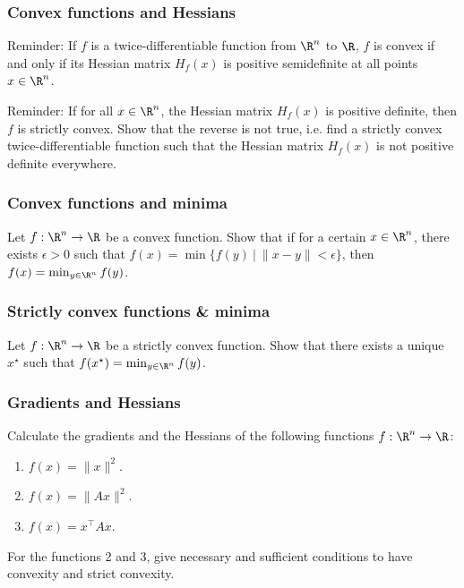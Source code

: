 \documentclass{beamer}
\begin{document}
\begin{frame}[t]
\frametitle{Convex functions and Hessians}
\vspace{-5pt}
Reminder: If $f$ is a twice-differentiable function from $\R^n$ to $\R$, $f$ is convex if and only if its Hessian matrix $H_f(x)$ is positive semidefinite at all points $x \in \R^n$.

Reminder: If for all $x \in \R^n$, the Hessian matrix $H_f(x)$ is positive definite, then $f$ is strictly convex. Show that the reverse is not true, i.e. find a strictly convex twice-differentiable function such that the Hessian matrix $H_f(x)$ is not positive definite everywhere.
\pause
\pause
\end{frame}

\begin{frame}[t]
\frametitle{Convex functions and minima}
Let $f : \R^n \rightarrow \R$ be a convex function. Show that if for a certain $x \in \R^n$, there exists $\epsilon > 0$ such that $f(x) = \min \{f(y) \ | \ \|x-y\| < \epsilon \}$, then $f(x) = \min_{y \in \R^n} f(y)$.
\pause
\end{frame}

\begin{frame}[t]
\frametitle{Strictly convex functions \& minima}
Let $f : \R^n \rightarrow \R$ be a strictly convex function. Show that there exists a unique $x^{\star}$ such that $f(x^{\star}) = \min_{y \in \R^n} f(y)$.
\pause
\end{frame}

\begin{frame}[t]
\frametitle{Gradients and Hessians}
\vspace{-10pt}
Calculate the gradients and the Hessians of the following functions $f : \R^n \rightarrow \R$:
\begin{enumerate}
\item $f(x) = \|x\|^2$.
\item $f(x) = \|Ax\|^2$.
\item $f(x) = x^\top A x$.
\end{enumerate}
For the functions 2 and 3, give necessary and sufficient conditions to have convexity and strict convexity.
\pause
\pause
\pause
\end{frame}

\begin{frame}[t]
\pause
\pause
\pause
\end{frame}
\end{document}
